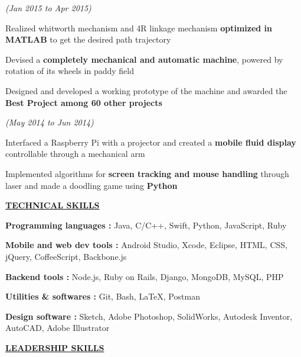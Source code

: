 \documentclass[a4paper]{deedy-resume} %
\begin{document}
\hfill {\textit{\small(Jan 2015 to Apr 2015)}}\\
\begin{tightitemize}
\item Realized whitworth mechanism and 4R linkage mechanism \textbf{optimized in MATLAB}  to get the desired path trajectory
\item Devised a \textbf{completely mechanical and automatic machine}, powered by rotation of its wheels in paddy field
\item Designed and developed a working prototype of the machine and awarded the \textbf{Best Project among 60 other projects}
\end{tightitemize}


\microspace

\hfill {\textit{\small(May 2014 to Jun 2014)}}\\

\begin{tightitemize}
\item Interfaced a Raspberry Pi with a projector and created a \textbf{mobile fluid display} controllable through a mechanical arm
\item Implemented algorithms for \textbf{screen tracking and mouse handling} through  laser and made a doodling game using \textbf{Python}
\end{tightitemize}
\sectionspace

{\uppercase\uline{\textbf{\large{Technical Skills}}\hfill}}
\microspace
\begin{tightitemize}
\item \textbf{Programming languages \hspace{10pt}:  } Java, C/C++, Swift, Python, JavaScript, Ruby
\item \textbf{Mobile and web dev tools   \hspace{1pt} : } Android Studio, Xcode, Eclipse, HTML, CSS, jQuery, CoffeeScript, Backbone.js
\item \textbf{Backend tools  \hspace{51pt} : }   Node.js, Ruby on Rails, Django, MongoDB, MySQL, PHP
\item \textbf{Utilities \& softwares \hspace{27pt}: } Git, Bash, \LaTeX, Postman
\item \textbf{Design software \hspace{45pt}: } Sketch, Adobe Photoshop, SolidWorks, Autodesk Inventor, AutoCAD, Adobe Illustrator
\end{tightitemize}
\sectionspace
{\uppercase\uline{\textbf{\large{Leadership Skills}}\hfill}}
\end{document}

